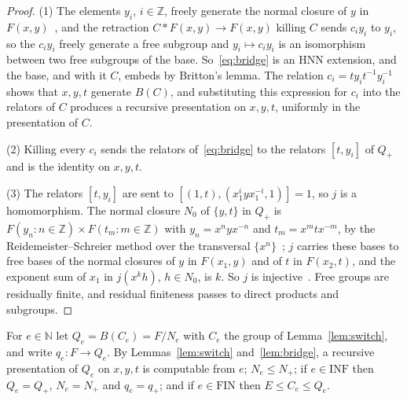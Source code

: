 \documentclass[11pt]{amsart}
\newcommand{\leanverified}[2]{\ignorespaces}
\theoremstyle{remark}
\theoremstyle{plain}
\begin{document}
\begin{proof}
(1) The elements $y_i$, $i\in\mathbb Z$, freely generate the normal
closure of $y$ in $F(x,y)$~\cite[Chapter~I]{LyndonSchupp}, and the
retraction $C*F(x,y)\to F(x,y)$ killing $C$ sends $c_iy_i$ to $y_i$, so the
$c_iy_i$ freely generate a free subgroup and $y_i\mapsto c_iy_i$ is an
isomorphism between two free subgroups of the base.  So~\eqref{eq:bridge}
is an HNN extension, and the base, and with it $C$, embeds by Britton's
lemma.  The relation $c_i=ty_it^{-1}y_i^{-1}$ shows that $x,y,t$ generate
$B(C)$, and substituting this expression for $c_i$ into the relators of
$C$ produces a recursive presentation on $x,y,t$, uniformly in the
presentation of $C$.

(2) Killing every $c_i$ sends the relators of~\eqref{eq:bridge} to the
relators $[t,y_i]$ of $Q_+$ and is the identity on $x,y,t$.

(3) The relators $[t,y_i]$ are sent to $[(1,t),(x_1^iyx_1^{-i},1)]=1$, so
$j$ is a homomorphism.  The normal closure $N_0$ of $\{y,t\}$ in $Q_+$ is
$F(y_n:n\in\mathbb Z)\times F(t_m:m\in\mathbb Z)$ with $y_n=x^nyx^{-n}$ and
$t_m=x^mtx^{-m}$, by the Reidemeister--Schreier method over the transversal
$\{x^n\}$~\cite[Chapter~II]{LyndonSchupp}; $j$ carries these bases to
free bases of the normal closures of $y$ in $F(x_1,y)$ and of $t$ in
$F(x_2,t)$, and the exponent sum of $x_1$ in $j(x^kh)$, $h\in N_0$, is
$k$.  So $j$ is injective~\cite{LeanDev}.  Free groups are residually
finite, and residual finiteness passes to direct products and subgroups.
\end{proof}
\leanverified{Manuscript/MFRecognition/ThreeGeneratorBridgeRecursive}{GroupApproximation.Manuscript.MFRecognition.Bridge.manuscriptBridge_one}
\leanverified{Manuscript/MFRecognition/BridgeUniformPresentation}{GroupApproximation.Manuscript.MFRecognition.HigmanCompiler.BridgeUniform.manuscriptBridge_one_uniform}
\leanverified{Manuscript/MFRecognition/ThreeGeneratorBridgeQuotient}{GroupApproximation.Manuscript.MFRecognition.Bridge.manuscriptBridge_two}
\leanverified{Manuscript/MFRecognition/ThreeGeneratorBridgeInjective}{GroupApproximation.Manuscript.MFRecognition.Bridge.manuscriptBridge_three}

For $e\in\mathbb N$ let $Q_e=B(C_e)=F/N_e$ with $C_e$ the group of
Lemma~\ref{lem:switch}, and write $q_e\colon F\to Q_e$.  By
Lemmas~\ref{lem:switch} and~\ref{lem:bridge}, a recursive presentation of
$Q_e$ on $x,y,t$ is computable from $e$; $N_e\le N_+$; if $e\in\mathrm{INF}$
then $Q_e=Q_+$, $N_e=N_+$ and $q_e=q_+$; and if $e\in\mathrm{FIN}$ then
$E\le C_e\le Q_e$.
\end{document}
